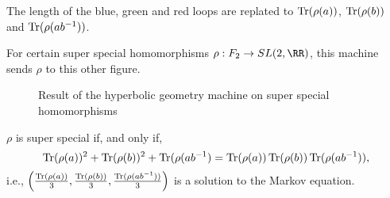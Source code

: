 The length of the blue, green and red loops are replated to $\operatorname{Tr}(\rho(a))$, $\operatorname{Tr}(\rho(b))$ and $\operatorname{Tr}(\rho(ab^{-1}))$.

For certain super special homomorphisms  $\rho: F_2 \to SL(2, \RR)$, this machine sends $\rho$ to this other figure.

\begin{figure}[ht]
    \centering
    \caption{Result of the hyperbolic geometry machine on super special homomorphisms}
    \label{fig:hyperbolic-geometry-machine-of-super-special-homomorphisms}
\end{figure}

\begin{thm}
	$\rho$ is super special if, and only if, \[\operatorname{Tr}(\rho(a))^2 + \operatorname{Tr}(\rho(b))^2 + \operatorname{Tr}(\rho(ab^{-1}) = \operatorname{Tr}(\rho(a))\operatorname{Tr}(\rho(b))\operatorname{Tr}(\rho(ab^{-1})),\] i.e., $\left(\frac{\operatorname{Tr}(\rho(a))}{3}, \frac{\operatorname{Tr}(\rho(b))}{3}, \frac{\operatorname{Tr}(\rho(ab^{-1}))}{3}\right)$ is a solution to the Markov equation.
\end{thm}
